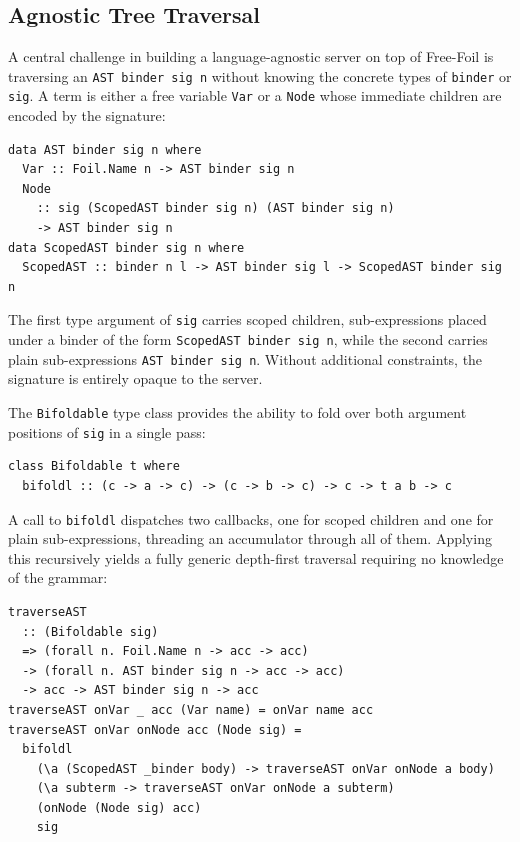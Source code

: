 \subsection{Agnostic Tree Traversal}
\label{subsec:agnostic_traversal}

A central challenge in building a language-agnostic server on top of Free-Foil is traversing an \texttt{AST binder sig n} without knowing the concrete types of \texttt{binder} or \texttt{sig}.
A term is either a free variable \texttt{Var} or a \texttt{Node} whose immediate children are encoded by the signature:

\begin{verbatim}
data AST binder sig n where
  Var :: Foil.Name n -> AST binder sig n
  Node 
    :: sig (ScopedAST binder sig n) (AST binder sig n) 
    -> AST binder sig n
data ScopedAST binder sig n where
  ScopedAST :: binder n l -> AST binder sig l -> ScopedAST binder sig n
\end{verbatim}

The first type argument of \texttt{sig} carries scoped children, sub-expressions placed under a binder of the form \texttt{ScopedAST binder sig n}, while the second carries plain sub-expressions \texttt{AST binder sig n}.
Without additional constraints, the signature is entirely opaque to the server.

The \texttt{Bifoldable} type class provides the ability to fold over both argument positions of \texttt{sig} in a single pass:

\begin{verbatim}
class Bifoldable t where
  bifoldl :: (c -> a -> c) -> (c -> b -> c) -> c -> t a b -> c
\end{verbatim}

A call to \texttt{bifoldl} dispatches two callbacks, one for scoped children and one for plain sub-expressions, threading an accumulator through all of them.
Applying this recursively yields a fully generic depth-first traversal requiring no knowledge of the grammar:

\begin{verbatim}
traverseAST
  :: (Bifoldable sig)
  => (forall n. Foil.Name n -> acc -> acc)
  -> (forall n. AST binder sig n -> acc -> acc)
  -> acc -> AST binder sig n -> acc
traverseAST onVar _ acc (Var name) = onVar name acc
traverseAST onVar onNode acc (Node sig) =
  bifoldl
    (\a (ScopedAST _binder body) -> traverseAST onVar onNode a body)
    (\a subterm -> traverseAST onVar onNode a subterm)
    (onNode (Node sig) acc)
    sig
\end{verbatim}

